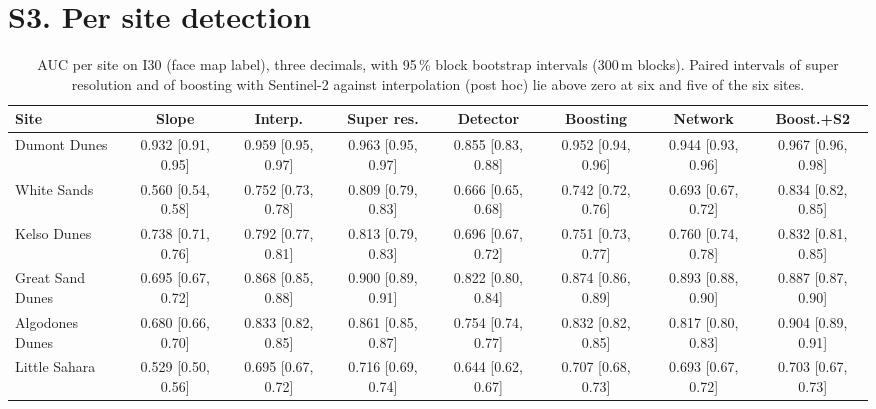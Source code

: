 \documentclass[10pt]{article}
\begin{document}
\section*{S3. Per site detection}
\begin{table}[H]
\caption{AUC per site on I30 (face map label), three decimals, with 95\,\% block bootstrap intervals (300\,m blocks). Paired intervals of super resolution and of boosting with Sentinel-2 against interpolation (post hoc) lie above zero at six and five of the six sites.}
\label{tab:persite}
\centering\scriptsize
\setlength{\tabcolsep}{2.5pt}
\begin{tabular}{@{}lccccccc@{}}
\toprule
Site & Slope & Interp. & Super res. & Detector & Boosting & Network & Boost.+S2 \\
\midrule
Dumont Dunes & 0.932 [0.91, 0.95] & 0.959 [0.95, 0.97] & 0.963 [0.95, 0.97] & 0.855 [0.83, 0.88] & 0.952 [0.94, 0.96] & 0.944 [0.93, 0.96] & 0.967 [0.96, 0.98] \\
White Sands & 0.560 [0.54, 0.58] & 0.752 [0.73, 0.78] & 0.809 [0.79, 0.83] & 0.666 [0.65, 0.68] & 0.742 [0.72, 0.76] & 0.693 [0.67, 0.72] & 0.834 [0.82, 0.85] \\
Kelso Dunes & 0.738 [0.71, 0.76] & 0.792 [0.77, 0.81] & 0.813 [0.79, 0.83] & 0.696 [0.67, 0.72] & 0.751 [0.73, 0.77] & 0.760 [0.74, 0.78] & 0.832 [0.81, 0.85] \\
Great Sand Dunes & 0.695 [0.67, 0.72] & 0.868 [0.85, 0.88] & 0.900 [0.89, 0.91] & 0.822 [0.80, 0.84] & 0.874 [0.86, 0.89] & 0.893 [0.88, 0.90] & 0.887 [0.87, 0.90] \\
Algodones Dunes & 0.680 [0.66, 0.70] & 0.833 [0.82, 0.85] & 0.861 [0.85, 0.87] & 0.754 [0.74, 0.77] & 0.832 [0.82, 0.85] & 0.817 [0.80, 0.83] & 0.904 [0.89, 0.91] \\
Little Sahara & 0.529 [0.50, 0.56] & 0.695 [0.67, 0.72] & 0.716 [0.69, 0.74] & 0.644 [0.62, 0.67] & 0.707 [0.68, 0.73] & 0.693 [0.67, 0.72] & 0.703 [0.67, 0.73] \\
\bottomrule
\end{tabular}
\end{table}
\end{document}
